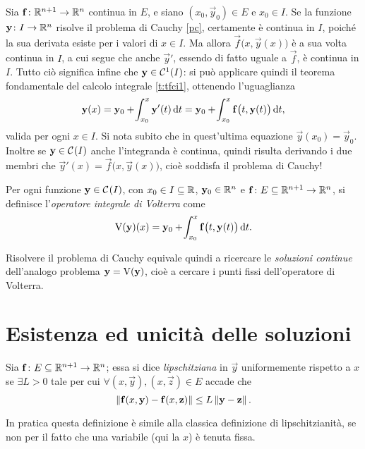 Sia $\mathbf{f}\colon\mathbb{R}^{n+1}\to\mathbb{R}^n$ continua in $E$, e siano $(x_0,\vec y_0)\in E$ e $x_0\in I$. Se la funzione $\mathbf{y}\colon I\to\mathbb{R}^n$ risolve il problema di Cauchy \eqref{pc}, certamente è continua in $I$, poiché la sua derivata esiste per i valori di $x\in I$. Ma allora $\vec f\big(x,\vec y(x)\big)$ è a sua volta continua in $I$, a cui segue che anche $\vec y'$, essendo di fatto uguale a $\vec f$, è continua in $I$. Tutto ciò significa infine che $\mathbf{y}\in\mathcal{C}^{{1}}(I)$: si può applicare quindi il teorema fondamentale del calcolo integrale \ref{t:tfci1}, ottenendo l'uguaglianza
\begin{equation}
\mathbf{y}(x)=\mathbf{y}_0+\!\int_{x_0}^x\mathbf{y}'(t)\,\textup{d} t=\mathbf{y}_0+\!\int_{x_0}^x\mathbf{f}\big(t,\mathbf{y}(t)\big)\,\textup{d} t,
\end{equation}
valida per ogni $x\in I$.
Si nota subito che in quest'ultima equazione $\vec y(x_0)=\vec y_0$. Inoltre se $\mathbf{y}\in\mathcal{C}^{{}}(I)$ anche l'integranda è continua, quindi risulta derivando i due membri che $\vec y'(x)=\vec f\big(x,\vec y(x)\big)$, cioè soddisfa il problema di Cauchy!

\begin{definizione} \label{d:volterra}
Per ogni funzione $\mathbf{y}\in\mathcal{C}^{{}}(I)$, con $x_0\in I\subseteq\mathbb{R}$, $\mathbf{y}_0\in\mathbb{R}^n$ e $\mathbf{f}\colon E\subseteq\mathbb{R}^{n+1}\to\mathbb{R}^n$, si definisce l'\emph{operatore integrale di Volterra} come
\begin{equation} \label{vol}
\operatorname{V}(\mathbf{y})(x)=\mathbf{y}_0+\!\int_{x_0}^x\mathbf{f}\big(t,\mathbf{y}(t)\big)\,\textup{d} t.
\end{equation}
\end{definizione}
Risolvere il problema di Cauchy equivale quindi a ricercare le \emph{soluzioni continue} dell'analogo problema $\mathbf{y}=\operatorname{V}(\mathbf{y})$, cioè a cercare i punti fissi dell'operatore di Volterra.

\section{Esistenza ed unicità delle soluzioni}
\begin{definizione} \label{d:lipschitziana-uniformemente}
	Sia $\mathbf{f}\colon E\subseteq\mathbb{R}^{n+1}\to\mathbb{R}^n$; essa si dice \emph{lipschitziana} in $\vec y$ uniformemente rispetto a $x$ se $\exists L>0$ tale per cui $\forall(x,\vec y),(x,\vec z)\in E$ accade che
	\begin{equation}
		\left\|{\mathbf{f}(x,\mathbf{y})-\mathbf{f}(x,\mathbf{z})}\right\|\leq L\left\|{\mathbf{y}-\mathbf{z}}\right\|.
	\end{equation}
\end{definizione}
In pratica questa definizione è simile alla classica definizione di lipschitzianità, se non per il fatto che una variabile (qui la $x$) è tenuta fissa.
